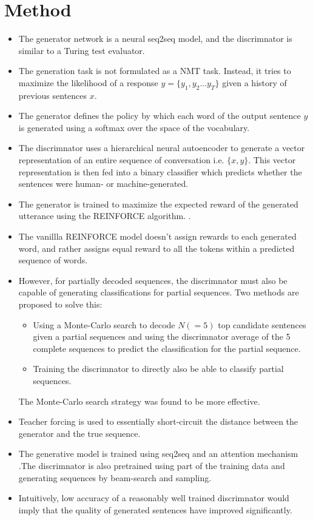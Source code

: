 \documentclass[12pt]{scrartcl}
\begin{document}
\section{Method}
  \begin{itemize}
    \item The generator network is a neural seq2seq model, and the discrimnator is similar to a Turing test evaluator.
    \item The generation task is not formulated as a NMT task. Instead, it tries to maximize the likelihood of a response $y = \{y_1, y_2 ... y_T\}$ given a history of previous sentences $x$.
    \item The generator defines the policy by which each word of the output sentence $y$ is generated using a softmax over the space of the vocabulary.
    \item The discrimnator uses a hierarchical neural autoencoder \cite{li2015hierarchical} to generate a vector representation of an entire sequence of conversation i.e. $\{x, y\}$. This vector representation is then fed into a binary classifier which predicts whether the sentences were human- or machine-generated.
    \item The generator is trained to maximize the expected reward of the generated utterance using the REINFORCE algorithm. \cite{williams1992simple}.
    \item The vanillla REINFORCE model doesn't assign rewards to each generated word, and rather assigns equal reward to all the tokens within a predicted sequence of words.
    \item However, for partially decoded sequences, the discrimnator must also be capable of generating classifications for partial sequences. Two methods are proposed to solve this:
      \begin{itemize}
        \item Using a Monte-Carlo search to decode $N ( = 5)$ top candidate sentences given a partial sequences and using the discrimnator average of the 5 complete sequences to predict the classification for the partial sequence.
        \item Training the discrimnator to directly also be able to classify partial sequences.
      \end{itemize}
    The Monte-Carlo search strategy was found to be more effective.
    \item Teacher forcing is used to essentially short-circuit the distance between the generator and the true sequence.
    \item The generative model is trained using seq2seq \cite{sutskever2014sequence} and an attention mechanism \cite{bahdanau2014neural}.The discrimnator is also pretrained using part of the training data and generating sequences by beam-search and sampling.
    \item Intuitively, low accuracy of a reasonably well trained discrimnator would imply that the quality of generated sentences have improved significantly.
  \end{itemize}
\end{document}
